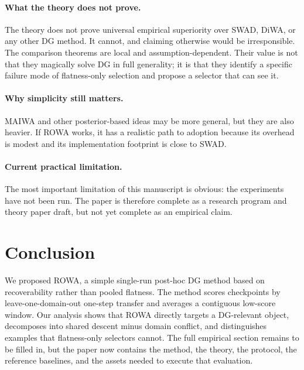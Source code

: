 \documentclass{article}
\newcommand{\rowa}{\textup{\textsc{ROWA}}}
\newcommand{\swad}{\textup{\textsc{SWAD}}}
\newcommand{\maiwa}{\textup{\textsc{MAIWA}}}
\begin{document}
\paragraph{What the theory does not prove.}
The theory does not prove universal empirical superiority over \swad{}, DiWA, or any other DG method. It cannot, and claiming otherwise would be irresponsible. The comparison theorems are local and assumption-dependent. Their value is not that they magically solve DG in full generality; it is that they identify a specific failure mode of flatness-only selection and propose a selector that can see it.

\paragraph{Why simplicity still matters.}
\maiwa{} and other posterior-based ideas may be more general, but they are also heavier. If \rowa{} works, it has a realistic path to adoption because its overhead is modest and its implementation footprint is close to \swad{}.

\paragraph{Current practical limitation.}
The most important limitation of this manuscript is obvious: the experiments have not been run. The paper is therefore complete as a research program and theory paper draft, but not yet complete as an empirical claim.

\section{Conclusion}

We proposed \rowa{}, a simple single-run post-hoc DG method based on recoverability rather than pooled flatness. The method scores checkpoints by leave-one-domain-out one-step transfer and averages a contiguous low-score window. Our analysis shows that \rowa{} directly targets a DG-relevant object, decomposes into shared descent minus domain conflict, and distinguishes examples that flatness-only selectors cannot. The full empirical section remains to be filled in, but the paper now contains the method, the theory, the protocol, the reference baselines, and the assets needed to execute that evaluation.




\appendix
\end{document}
